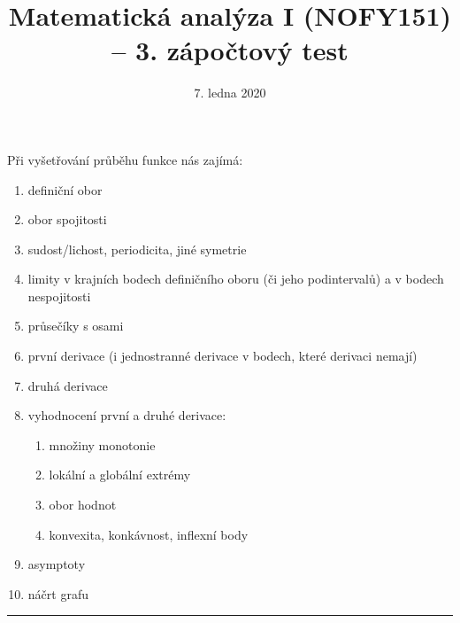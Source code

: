 \documentclass[answers]{exam}
\title{\vspace{-3ex}Matematická analýza I (NOFY151) – 3. zápočtový test\vspace{-1ex}}
\author{\vspace{-2ex}}
\date{\vspace{-2ex}7. ledna 2020}
\begin{document}
\maketitle

Při vyšetřování průběhu funkce nás zajímá:
\begin{enumerate}
	\item definiční obor
	\item obor spojitosti 
	\item sudost/lichost, periodicita, jiné symetrie
	\item limity v krajních bodech definičního oboru (či jeho podintervalů) a v bodech nespojitosti
	\item průsečíky s osami
	\item první derivace (i jednostranné derivace v bodech, které derivaci nemají)
	\item druhá derivace
	\item vyhodnocení první a druhé derivace: 
		\begin{enumerate}
			\item množiny monotonie
			\item lokální a globální extrémy
			\item obor hodnot
			\item konvexita, konkávnost, inflexní body
		\end{enumerate} 
	\item asymptoty
	\item náčrt grafu
\end{enumerate}

\vspace{6pt}
\hrule
\vspace{6pt}
\end{document}
